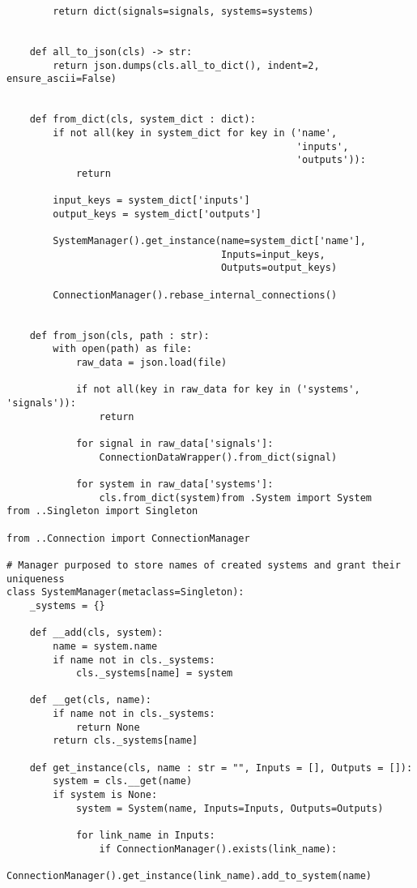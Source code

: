 {\begin{lstlisting}
        return dict(signals=signals, systems=systems)
    
    
    def all_to_json(cls) -> str:
        return json.dumps(cls.all_to_dict(), indent=2, ensure_ascii=False)
    
    
    def from_dict(cls, system_dict : dict):
        if not all(key in system_dict for key in ('name',
                                                  'inputs', 
                                                  'outputs')):
            return
        
        input_keys = system_dict['inputs']
        output_keys = system_dict['outputs']
        
        SystemManager().get_instance(name=system_dict['name'],
                                     Inputs=input_keys,
                                     Outputs=output_keys)
        
        ConnectionManager().rebase_internal_connections()
    
    
    def from_json(cls, path : str):
        with open(path) as file:
            raw_data = json.load(file)
            
            if not all(key in raw_data for key in ('systems', 'signals')):
                return
            
            for signal in raw_data['signals']:
                ConnectionDataWrapper().from_dict(signal)
            
            for system in raw_data['systems']:
                cls.from_dict(system)from .System import System
from ..Singleton import Singleton

from ..Connection import ConnectionManager

# Manager purposed to store names of created systems and grant their uniqueness
class SystemManager(metaclass=Singleton):
    _systems = {}

    def __add(cls, system):
        name = system.name
        if name not in cls._systems:
            cls._systems[name] = system
    
    def __get(cls, name):
        if name not in cls._systems:
            return None
        return cls._systems[name]
    
    def get_instance(cls, name : str = "", Inputs = [], Outputs = []):
        system = cls.__get(name)
        if system is None:
            system = System(name, Inputs=Inputs, Outputs=Outputs)
            
            for link_name in Inputs:
                if ConnectionManager().exists(link_name):
                    ConnectionManager().get_instance(link_name).add_to_system(name)
            

\end{lstlisting}}
